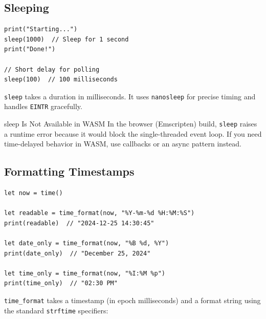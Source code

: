 \subsection{Sleeping}\label{sec:sleep}

\begin{lstlisting}[language=Lattice, caption={Pausing execution}]
print("Starting...")
sleep(1000)  // Sleep for 1 second
print("Done!")

// Short delay for polling
sleep(100)  // 100 milliseconds
\end{lstlisting}

\lstinline|sleep| takes a duration in milliseconds. It uses
\texttt{nanosleep} for precise timing and handles \texttt{EINTR} gracefully.

\begin{warnbox}{sleep Is Not Available in WASM}
In the browser (Emscripten) build, \lstinline|sleep| raises a runtime error
because it would block the single-threaded event loop. If you need
time-delayed behavior in WASM, use callbacks or an async pattern instead.
\end{warnbox}

\subsection{Formatting Timestamps}\label{sec:time-format}

\begin{lstlisting}[language=Lattice, caption={Formatting a timestamp as a human-readable string}]
let now = time()

let readable = time_format(now, "%Y-%m-%d %H:%M:%S")
print(readable)  // "2024-12-25 14:30:45"

let date_only = time_format(now, "%B %d, %Y")
print(date_only)  // "December 25, 2024"

let time_only = time_format(now, "%I:%M %p")
print(time_only)  // "02:30 PM"
\end{lstlisting}

\lstinline|time_format| takes a timestamp (in epoch milliseconds) and a
format string using the standard \texttt{strftime} specifiers:

